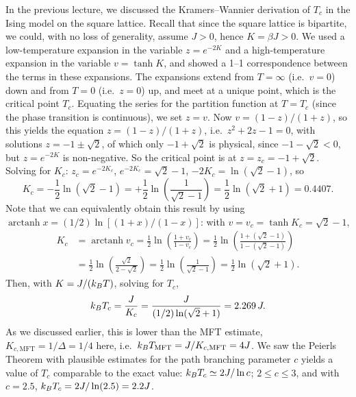 
In the previous lecture, we discussed the Kramers--Wannier derivation of $T_c$ in the Ising model on
the square lattice. Recall that since the square lattice is bipartite, we could, with no loss of
generality, assume $J>0$, hence $K = \beta J>0$. We used a low-temperature expansion in the variable
$z = e^{-2K}$ and a high-temperature expansion in the variable $v = \tanh K$, and showed a 1--1
correspondence between the terms in these expansions. The expansions extend from $T = \infty$ (i.e.\
$v = 0$) down and from $T = 0$ (i.e.\ $z = 0$) up, and meet at a unique point, which is the critical
point $T_c$. Equating the series for the partition function at $T = T_c$ (since the phase transition is
continuous), we set $z = v$. Now $v = (1-z)/(1+z)$, so this yields the equation
$z = (1-z)/(1+z)$, i.e.\ $z^2+2z-1 = 0$, with solutions $z = -1\pm\sqrt2$, of which only
$-1+\sqrt2$ is physical, since $-1-\sqrt2<0$, but $z = e^{-2K}$ is non-negative. So the critical point
is at $z = z_c = -1+\sqrt2$. Solving for $K_c$: $z_c = e^{-2K_c}$, $e^{-2K_c} = \sqrt2-1$,
$-2K_c = \ln(\sqrt2-1)$, so
\begin{equation}
  K_c = -\frac{1}{2}\ln(\sqrt2-1) = +\frac{1}{2}\ln\left(\frac{1}{\sqrt2-1}\right) = \frac{1}{2}\ln(\sqrt2+1) = 0.4407 .
\end{equation}
Note that we can equivalently obtain this result by using
$\operatorname{arctanh}x = (1/2)\ln[(1+x)/(1-x)]$:
with $v = v_c = \tanh K_c = \sqrt2-1$,
\begin{align}
  K_c &= \operatorname{arctanh}v_c = \frac{1}{2}\ln\left(\frac{1+v_c}{1-v_c}\right)
       = \frac{1}{2}\ln\left(\frac{1+(\sqrt2-1)}{1-(\sqrt2-1)}\right)\nonumber\\
      &= \frac{1}{2}\ln\left(\frac{\sqrt2}{2-\sqrt2}\right) = \frac{1}{2}\ln\left(\frac{1}{\sqrt2-1}\right) = \frac{1}{2}\ln(\sqrt2+1).
\end{align}
Then, with $K = J/(k_{B} T)$, solving for $T_c$,
\begin{equation}
  k_{B} T_c = \frac{J}{K_c} = \frac{J}{(1/2)\ln(\sqrt2+1)} = 2.269\,J .
\end{equation}
As we discussed earlier, this is lower than the MFT estimate, $K_{c,\text{MFT}} = 1/\Delta = 1/4$
here, i.e.\ $k_{B} T_{\text{MFT}} = J/K_{c,\text{MFT}} = 4J$. We saw the Peierls Theorem with plausible
estimates for the path branching parameter $c$ yields a value of $T_c$ comparable to the exact value:
$k_{B} T_c\simeq 2J/\ln c$; $2\le c\le 3$, and with $c = 2.5$, $k_{B} T_c = 2J/\ln(2.5) = 2.2J$.

